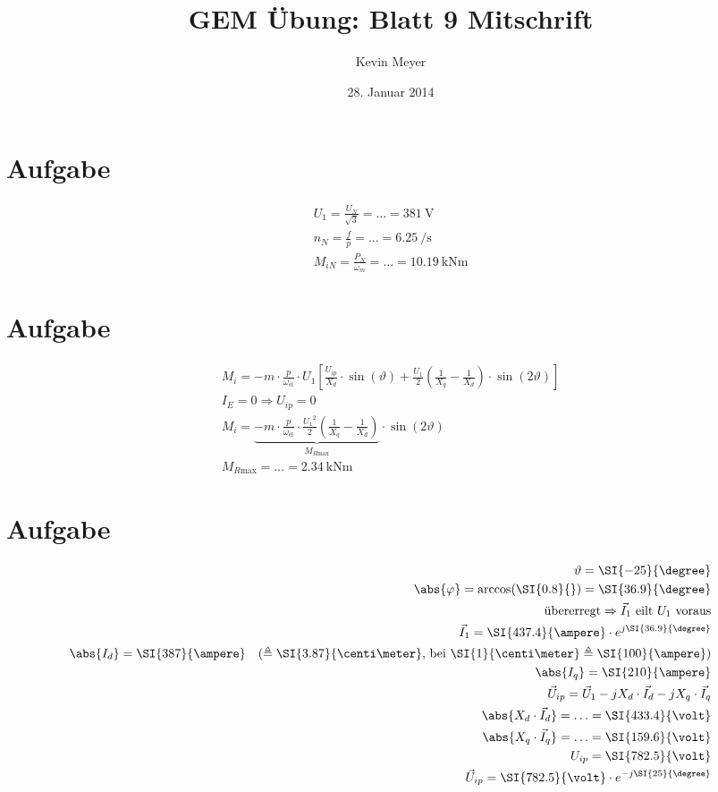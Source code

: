 \documentclass[10pt,a4paper]{article}
\begin{document}
\title{GEM Übung: \textbf{Blatt 9} Mitschrift}
\date{28. Januar 2014}
\author{Kevin Meyer}
\maketitle


\section{Aufgabe}
\begin{align*}
U_1 = \frac{U_N}{\sqrt{3}} = \ldots = \SI{381}{\volt}\\
n_N = \frac{f}{p} = \ldots = \SI{6.25}{\per\second}\\
M_{iN} = \frac{P_N}{\omega_m} = \ldots = \SI{10.19}{\kilo\newton\meter}
\end{align*}

\section{Aufgabe}
\begin{align*}
M_i = -m \cdot \frac{p}{\omega_\text{el}} \cdot U_1 \left[\frac{U_{ip}}{X_d} \cdot \sin(\vartheta) + \frac{U_1}{2} \left( \frac{1}{X_q} - \frac{1}{X_d} \right) \cdot \sin(2\vartheta)\right]\\
I_{E} = 0 \Rightarrow U_{ip} = 0\\
M_i = \underbrace{-m \cdot \frac{p}{\omega_\text{el}} \cdot \frac{{U_1}^2}{2} \left( \frac{1}{X_q} - \frac{1}{X_d} \right)}_{M_{R\text{max}}} \cdot \sin(2\vartheta)\\
M_{R\text{max}} = \ldots = \SI{2.34}{\kilo\newton\meter}
\end{align*}

\section{Aufgabe}
\begin{align*}
\vartheta = \SI{-25}{\degree}\\
\abs{\varphi} = \arccos(\SI{0.8}{}) = \SI{36.9}{\degree}\\
\text{übererregt} \Rightarrow \vec I_1 \text{ eilt $U_1$ voraus}\\
\vec I_1 = \SI{437.4}{\ampere} \cdot e^{j \SI{36.9}{\degree}}\\
\abs{I_d} = \SI{387}{\ampere} \quad (\triangleq \SI{3.87}{\centi\meter} \text{, bei $\SI{1}{\centi\meter} \triangleq \SI{100}{\ampere}$})\\
\abs{I_q} = \SI{210}{\ampere}\\
\vec U_{ip} = \vec U_1 - jX_d\cdot \vec I_d - jX_q\cdot \vec I_q\\
\abs{X_d\cdot \vec I_d} = \ldots = \SI{433.4}{\volt}\\
\abs{X_q\cdot \vec I_q} = \ldots = \SI{159.6}{\volt}\\
U_{ip} = \SI{782.5}{\volt}\\
\vec U_{ip} = \SI{782.5}{\volt} \cdot e^{-j\SI{25}{\degree}}
\end{align*}
\end{document}
